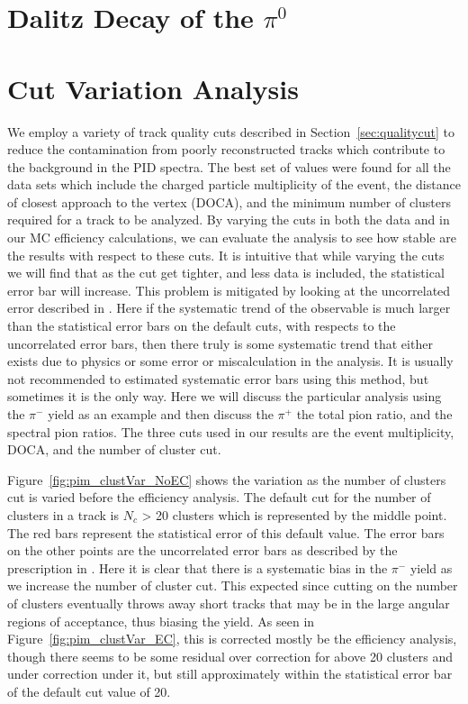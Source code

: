 \clearpage

\section{Dalitz Decay of the $\pi^0$}
\label{appen:dalitz}


\section{Cut Variation Analysis}
\label{sec:cutvar}

We employ a variety of track quality cuts described in Section~\ref{sec:qualitycut} to reduce the contamination from poorly reconstructed tracks which contribute to the background in the PID spectra. The best set of values were found for all the data sets which include the charged particle multiplicity of the event, the distance of closest approach to the vertex (DOCA), and the minimum number of clusters required for a track to be analyzed. By varying the cuts in both the data and in our MC efficiency calculations, we can evaluate the analysis to see how stable are the results with respect to these cuts. It is intuitive that while varying the cuts we will find that as the cut get tighter, and less data is included, the statistical error bar will increase. This problem is mitigated by looking at the uncorrelated error described in \cite{dataAnalysis}. Here if the systematic trend of the observable is much larger than the statistical error bars on the default cuts, with respects to the uncorrelated error bars, then there truly is some systematic trend that either exists due to physics or some error or miscalculation in the analysis. It is usually not recommended to estimated systematic error bars using this method, but sometimes it is the only way. Here we will discuss the particular analysis using the $\pi^-$ yield as an example and then discuss the $\pi^+$ the total pion ratio, and the spectral pion ratios. The three cuts used in our results are the event multiplicity, DOCA, and the number of cluster cut.


 Figure~\ref{fig:pim_clustVar_NoEC} shows the variation as the number of clusters cut is varied before the efficiency analysis. The default cut for the number of clusters in a track is $N_c$ > 20 clusters which is represented by the middle point. The red bars represent the statistical error of this default value. The error bars on the other points are the uncorrelated error bars as described by the prescription in \cite{dataAnalysis}. Here it is clear that there is a systematic bias in the $\pi^-$ yield as we increase the number of cluster cut. This expected since cutting on the number of clusters eventually throws away short tracks that may be in the large angular regions of acceptance, thus biasing the yield. As seen in Figure~\ref{fig:pim_clustVar_EC}, this is corrected mostly be the efficiency analysis, though there seems to be some residual over correction for above 20 clusters and under correction under it, but still approximately within the statistical error bar of the default cut value of 20. 
 
